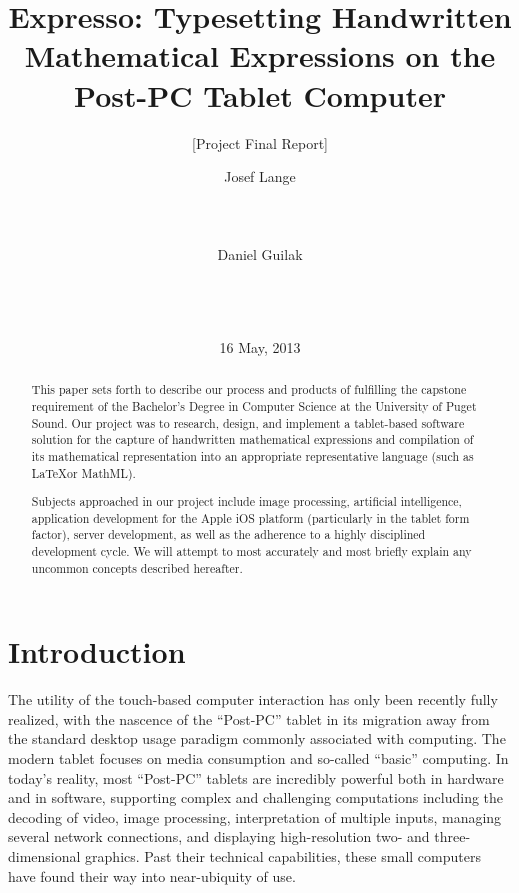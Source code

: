 \documentclass{acm_proc_article-sp}
\begin{document}
\title{ Expresso: Typesetting Handwritten Mathematical Expressions on the Post-PC Tablet Computer }
\subtitle{ [Project Final Report] }


\author{
\alignauthor
Josef Lange\\
       \\
       \\
       \\
\alignauthor       
Daniel Guilak\\
       \\
       \\
       \\
}
       
\date{16 May, 2013}

\maketitle

\begin{abstract}
This paper sets forth to describe our process and products of fulfilling the capstone requirement of the Bachelor's Degree in Computer Science at the University of Puget Sound. Our project was to research, design, and implement a tablet-based software solution for the capture of handwritten mathematical expressions and compilation of its mathematical representation into an appropriate representative language (such as \LaTeX or MathML).

Subjects approached in our project include image processing, artificial intelligence, application development for the Apple iOS platform (particularly in the tablet form factor), server development, as well as the adherence to a highly disciplined development cycle. We will attempt to most accurately and most briefly explain any uncommon concepts described hereafter.
\end{abstract}

\section{Introduction}
The utility of the touch-based computer interaction has only been recently fully realized, with the nascence of the ``Post-PC'' tablet in its migration away from the standard desktop usage paradigm commonly associated with computing. The modern tablet focuses on media consumption and so-called ``basic'' computing. In today's reality, most ``Post-PC'' tablets are incredibly powerful both in hardware and in software, supporting complex and challenging computations including the decoding of video, image processing, interpretation of multiple inputs, managing several network connections, and displaying high-resolution two- and three-dimensional graphics. Past their technical capabilities, these small computers have found their way into near-ubiquity of use. 
\end{document}
